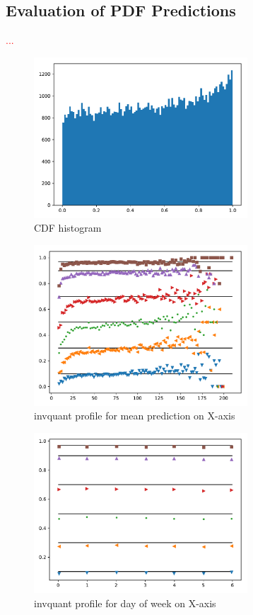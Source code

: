 \documentclass[BCOR=1mm, DIV=calc,10pt,
twoside=true,
twocolumn,
headings=normal]{scrartcl}
\begin{document}
\subsection{Evaluation of PDF Predictions}

\textcolor{red}{...}

\begin{figure}
\begin{center}
\includegraphics[width=8cm]{../figures/cdf_truth}
\caption{\label{fig:cdf_demand} CDF histogram}
\end{center}
\end{figure}

\begin{figure}
\begin{center}
\includegraphics[width=8cm]{../figures/invquant_yhat_mean}
\caption{\label{fig:invquant_mean} invquant profile for mean prediction on X-axis}
\end{center}
\end{figure}

\begin{figure}
\begin{center}
\includegraphics[width=8cm]{../figures/invquant_dayofweek}
\caption{\label{fig:invquant_dayofweek} invquant profile for day of week on X-axis}
\end{center}
\end{figure}
\end{document}
